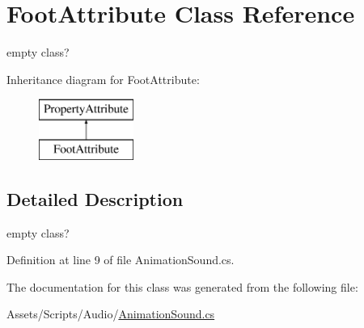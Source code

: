 \hypertarget{class_foot_attribute}{}\section{Foot\+Attribute Class Reference}
\label{class_foot_attribute}


empty class?  


Inheritance diagram for Foot\+Attribute\+:\begin{figure}[H]
\begin{center}
\leavevmode
\includegraphics[height=2.000000cm]{class_foot_attribute}
\end{center}
\end{figure}


\subsection{Detailed Description}
empty class? 



Definition at line 9 of file Animation\+Sound.\+cs.



The documentation for this class was generated from the following file\+:\begin{DoxyCompactItemize}
\item 
Assets/\+Scripts/\+Audio/\mbox{\hyperlink{_animation_sound_8cs}{Animation\+Sound.\+cs}}\end{DoxyCompactItemize}

